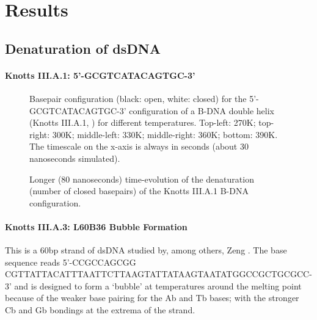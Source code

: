 \section{Results}

\subsection{Denaturation of dsDNA}

\paragraph{Knotts III.A.1: 5'-GCGTCATACAGTGC-3'}

\begin{figure}[h] \begin{minipage}{7cm}
 \end{minipage} \begin{minipage}{7cm}  \end{minipage}
\begin{minipage}{7cm}
 \end{minipage} \begin{minipage}{7cm}\end{minipage}\begin{center}

\caption{Basepair configuration (black: open, white: closed) for the 5'-GCGTCATACAGTGC-3' configuration of a B-DNA double helix (Knotts III.A.1, \cite{knotts2007coarse}) for different temperatures. Top-left: 270K; top-right: 300K; middle-left: 330K; middle-right: 360K; bottom: 390K. The timescale on the x-axis is always in seconds (about 30 nanoseconds simulated).}\end{center}
\end{figure}

\begin{figure}\begin{center}

\caption{Longer (80 nanoseconds) time-evolution of the denaturation (number of closed basepairs) of the Knotts III.A.1 B-DNA configuration.}\end{center}\end{figure}

\paragraph{Knotts III.A.3: L60B36 Bubble Formation} This is a 60bp strand of dsDNA studied by, among others, Zeng \etal \cite{zeng}. The base sequence reads 5'-CCGCCAGCGG CGTTATTACATTTAATTCTTAAGTATTATAAGTAATATGGCCGCTGCGCC-3' and is designed to form a `bubble' at temperatures around the melting point because of the weaker base pairing for the Ab and Tb bases; with the stronger Cb and Gb bondings at the extrema of the strand. 


